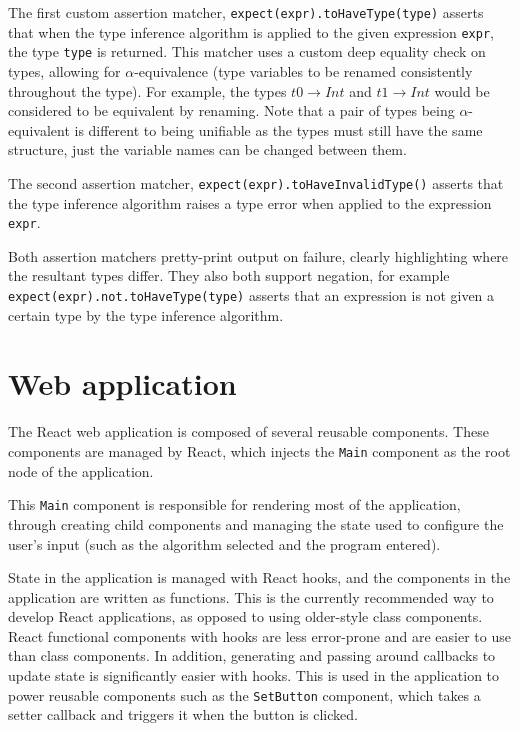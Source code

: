 \documentclass[a4paper,fleqn,oneside,12pt]{report}
\begin{document}
The first custom assertion matcher, \texttt{expect(expr).toHaveType(type)} asserts that when the type inference algorithm is applied to the given expression \texttt{expr}, the type \texttt{type} is returned. This matcher uses a custom deep equality check on types, allowing for $\alpha$-equivalence (type variables to be renamed consistently throughout the type). For example, the types $t0 \rightarrow Int$ and $t1 \rightarrow Int$ would be considered to be equivalent by renaming. Note that a pair of types being $\alpha$-equivalent is different to being unifiable as the types must still have the same structure, just the variable names can be changed between them.

The second assertion matcher, \texttt{expect(expr).toHaveInvalidType()} asserts that the type inference algorithm raises a type error when applied to the expression \texttt{expr}.

Both assertion matchers pretty-print output on failure, clearly highlighting where the resultant types differ. They also both support negation, for example \texttt{expect(expr).not.toHaveType(type)} asserts that an expression is not given a certain type by the type inference algorithm.

\section{Web application}\label{id:h.jqmg1n3w35mp}

The React web application is composed of several reusable components. These components are managed by React, which injects the \texttt{Main} component as the root node of the application.

This \texttt{Main} component is responsible for rendering most of the application, through creating child components and managing the state used to configure the user's input (such as the algorithm selected and the program entered).

State in the application is managed with React hooks, and the components in the application are written as functions. This is the currently recommended way to develop React applications, as opposed to using older-style class components. React functional components with hooks are less error-prone and are easier to use than class components. In addition, generating and passing around callbacks to update state is significantly easier with hooks. This is used in the application to power reusable components such as the \texttt{SetButton} component, which takes a setter callback and triggers it when the button is clicked.
\end{document}
